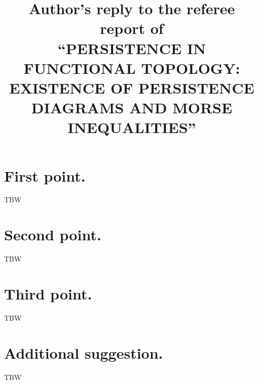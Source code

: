 \documentclass{article}
\title{Author's reply to the referee report of \\
\textsc{``PERSISTENCE IN FUNCTIONAL TOPOLOGY: EXISTENCE OF PERSISTENCE DIAGRAMS AND MORSE INEQUALITIES''}
}
\begin{document}
	\maketitle
	\section{First point.} TBW

	\section{Second point.} TBW

	\section{Third point.} TBW

	\section{Additional suggestion.} TBW
\end{document}
